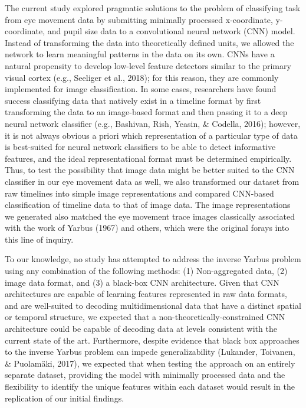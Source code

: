 \documentclass[
  english,
  man, donotrepeattitle,floatsintext]{apa6}
\begin{document}
The current study explored pragmatic solutions to the problem of classifying task from eye movement data by submitting minimally processed x-coordinate, y-coordinate, and pupil size data to a convolutional neural network (CNN) model. Instead of transforming the data into theoretically defined units, we allowed the network to learn meaningful patterns in the data on its own. CNNs have a natural propensity to develop low-level feature detectors similar to the primary visual cortex (e.g., Seeliger et al., 2018); for this reason, they are commonly implemented for image classification. In some cases, researchers have found success classifying data that natively exist in a timeline format by first transforming the data to an image-based format and then passing it to a deep neural network classifier (e.g., Bashivan, Rish, Yeasin, \& Codella, 2016); however, it is not always obvious a priori which representation of a particular type of data is best-suited for neural network classifiers to be able to detect informative features, and the ideal representational format must be determined empirically. Thus, to test the possibility that image data might be better suited to the CNN classifier in our eye movement data as well, we also transformed our dataset from raw timelines into simple image representations and compared CNN-based classification of timeline data to that of image data. The image representations we generated also matched the eye movement trace images classically associated with the work of Yarbus (1967) and others, which were the original forays into this line of inquiry.

To our knowledge, no study has attempted to address the inverse Yarbus problem using any combination of the following methods: (1) Non-aggregated data, (2) image data format, and (3) a black-box CNN architecture. Given that CNN architectures are capable of learning features represented in raw data formats, and are well-suited to decoding multidimensional data that have a distinct spatial or temporal structure, we expected that a non-theoretically-constrained CNN architecture could be capable of decoding data at levels consistent with the current state of the art. Furthermore, despite evidence that black box approaches to the inverse Yarbus problem can impede generalizability (Lukander, Toivanen, \& Puolamäki, 2017), we expected that when testing the approach on an entirely separate dataset, providing the model with minimally processed data and the flexibility to identify the unique features within each dataset would result in the replication of our initial findings.
\end{document}
